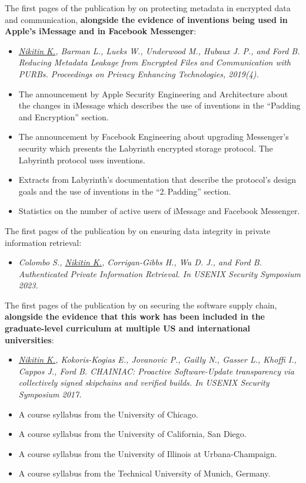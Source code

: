 \begin{thebibliography}{25}
The first pages of the publication by \dr on protecting metadata in encrypted
data and communication, \textbf{alongside the evidence of \drs inventions
being used in Apple's iMessage and in Facebook Messenger}:
\begin{itemize}
	\item \textit{\underline{Nikitin K.}, Barman L., Lueks W., Underwood M., Hubaux J. P., and Ford B. Reducing Metadata Leakage from Encrypted Files and Communication with {PURBs}. Proceedings on Privacy Enhancing Technologies, 2019(4).}
	\item The announcement by Apple Security Engineering and Architecture about
	the changes in iMessage which describes the use of \drs inventions in the
	``Padding and Encryption'' section.
	\item The announcement by Facebook Engineering about upgrading Messenger's
	security which presents the Labyrinth encrypted storage protocol.
	The Labyrinth protocol uses \drs inventions.
	\item Extracts from Labyrinth's documentation that describe the protocol's
	design goals and the use of \drs inventions in the ``2.\,Padding'' section.
	\item Statistics on the number of active users of iMessage and Facebook
	Messenger.
\end{itemize}

The first pages of the publication by \dr on ensuring data integrity in private
information retrieval:
\begin{itemize}
	\item \textit{Colombo S., \underline{Nikitin K.}, Corrigan-Gibbs H., Wu
	D. J., and Ford B. Authenticated Private Information Retrieval. In USENIX
	Security Symposium 2023.}
\end{itemize}

The first pages of the publication by \dr on securing the software supply chain,
\textbf{alongside the evidence that this work has been included in the
graduate-level curriculum at multiple US and international universities}:
\begin{itemize}
	\item \textit{\underline{Nikitin K.}, Kokoris-Kogias E., Jovanovic P.,
	Gailly N., Gasser L., Khoffi I., Cappos J., Ford B. {CHAINIAC}: Proactive
	{Software-Update} transparency via collectively signed skipchains and
	verified builds. In USENIX Security Symposium 2017.}
	\item A course syllabus from the University of Chicago.
	\item A course syllabus from the University of California, San Diego.
	\item A course syllabus from the University of Illinois at Urbana-Champaign.
	\item A course syllabus from the Technical University of Munich, Germany.
\end{itemize}


\end{thebibliography}
